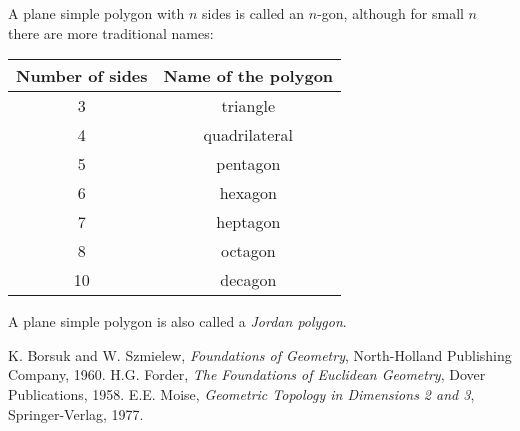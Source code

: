 \documentclass{article}
\begin{document}
A plane simple polygon with $n$ sides is called an $n$-gon, although for small $n$
there are more traditional names:

\begin{center}
\begin{tabular}{||c|c||} \hline
Number of sides& Name of the polygon \\ \hline
3 & triangle \\
4 & quadrilateral \\
5 & pentagon\\
6 & hexagon \\
7 & heptagon\\
8 & octagon\\
10 & decagon\\
\hline 
\end{tabular}
\end{center}

A plane simple polygon is also called a \emph{Jordan polygon}. 















\begin{thebibliography}{9}
K. Borsuk and W. Szmielew, \emph{Foundations of Geometry},
North-Holland Publishing Company, 1960.
H.G. Forder, \emph{The Foundations of Euclidean Geometry},
Dover Publications, 1958.
E.E. Moise, \emph{Geometric Topology in Dimensions 2 and 3}, 
Springer-Verlag, 1977.
 
\end{thebibliography}

\end{document}
